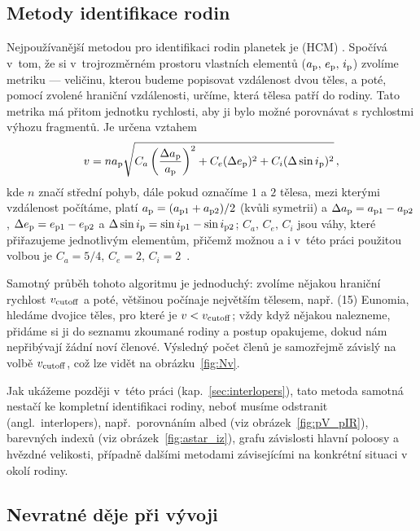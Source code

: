 \documentclass[A4paper, 12pt, oneside]{book}
\begin{document}
\subsection{Metody identifikace rodin} \label{sec:metodyiden}
Nejpoužívanější metodou pro identifikaci rodin planetek je  (HCM) \cite{zappala90}. Spočívá v~tom, že si v~trojrozměrném prostoru vlastních elementů ($a_{\rm p},\,e_{\rm p},\,i_{\rm p}$) zvolíme metriku --- veličinu, kterou budeme popisovat vzdálenost dvou těles, a poté, pomocí zvolené hraniční  vzdálenosti, určíme, která tělesa patří do rodiny. Tato metrika má přitom jednotku rychlosti, aby ji bylo možné porovnávat s rychlostmi výhozu fragmentů. Je určena vztahem
\begin{align}
	v=na_{\rm p}\sqrt{C_a\left(\frac{\Delta a_{\rm p}}{a_{\rm p}}\right)^2+C_e(\Delta e_{\rm p})^2+C_i(\Delta \sin i_{\rm p})^2}\,,
\end{align}
kde $n$ značí střední pohyb, dále pokud označíme $1$ a $2$ tělesa, mezi kterými vzdálenost počítáme, platí $a_{\rm p}=(a_{{\rm p}1}+a_{{\rm p}2})/2$ (kvůli symetrii) a $\Delta a_{\rm p}=a_{{\rm p}1}-a_{{\rm p}2}$, $\Delta e_{\rm p}=e_{{\rm p}1}-e_{{\rm p}2}$ a $\Delta \sin i_{\rm p}=\sin i_{{\rm p}1}-\sin i_{{\rm p}2}$; $C_a,\,C_e,\,C_i$ jsou váhy, které přiřazujeme jednotlivým elementům, přičemž možnou a i v~této práci použitou volbou je $C_a=5/4$, $C_e=2$, $C_i=2$~\cite{zappala90}. 

Samotný průběh tohoto algoritmu je jednoduchý: zvolíme nějakou hraniční rychlost $v_{\rm cutoff}$ a poté, většinou počínaje největším tělesem, např. (15) Eunomia, hledáme dvojice těles, pro které je $v<v_{\rm cutoff}$; vždy když nějakou nalezneme, přidáme si ji do seznamu zkoumané rodiny a postup opakujeme, dokud nám nepřibývají žádní noví členové. Výsledný počet členů je samozřejmě závislý na volbě $v_{\rm cutoff}$, což lze vidět na obrázku~\ref{fig:Nv}.

Jak ukážeme později v~této práci (kap.~\ref{sec:interlopers}), tato metoda samotná nestačí ke kompletní identifikaci rodiny, neboť musíme odstranit  (angl.\ interlopers), např.\ porovnáním albed (viz obrázek~\ref{fig:pV_pIR}), barevných indexů (viz obrázek~\ref{fig:astar_iz}), grafu závislosti hlavní poloosy a hvězdné velikosti, případně dalšími metodami závisejícími na konkrétní situaci v okolí rodiny.

\subsection{Nevratné děje při vývoji}
\end{document}
